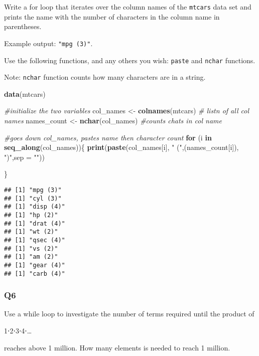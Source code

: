 \documentclass[
]{article}
\newenvironment{Shaded}{\begin{snugshade}}{\end{snugshade}}
\newcommand{\CommentTok}[1]{\textcolor[rgb]{0.56,0.35,0.01}{\textit{#1}}}
\newcommand{\ControlFlowTok}[1]{\textcolor[rgb]{0.13,0.29,0.53}{\textbf{#1}}}
\newcommand{\DataTypeTok}[1]{\textcolor[rgb]{0.13,0.29,0.53}{#1}}
\newcommand{\KeywordTok}[1]{\textcolor[rgb]{0.13,0.29,0.53}{\textbf{#1}}}
\newcommand{\NormalTok}[1]{#1}
\newcommand{\StringTok}[1]{\textcolor[rgb]{0.31,0.60,0.02}{#1}}
\begin{document}
Write a for loop that iterates over the column names of the
\texttt{mtcars} data set and prints the name with the number of
characters in the column name in parentheses.

Example output: \texttt{"mpg\ (3)"}.

Use the following functions, and any others you wish: \texttt{paste} and
\texttt{nchar} functions.

Note: \texttt{nchar} function counts how many characters are in a
string.

\begin{Shaded}
\begin{Highlighting}[]
\KeywordTok{data}\NormalTok{(mtcars)}

\CommentTok{#initialize the two variables}
\NormalTok{col_names <-}\StringTok{ }\KeywordTok{colnames}\NormalTok{(mtcars) }\CommentTok{# listn of all col names}
\NormalTok{names_count <-}\StringTok{ }\KeywordTok{nchar}\NormalTok{(col_names) }\CommentTok{#counts chats in col name}

\CommentTok{#goes down col_names, pastes name then character count}
\ControlFlowTok{for}\NormalTok{ (i }\ControlFlowTok{in} \KeywordTok{seq_along}\NormalTok{(col_names))\{}
    \KeywordTok{print}\NormalTok{(}\KeywordTok{paste}\NormalTok{(col_names[i], }\StringTok{" ("}\NormalTok{,(names_count[i]), }\StringTok{")"}\NormalTok{,}\DataTypeTok{sep =} \StringTok{""}\NormalTok{))}

\NormalTok{\}}
\end{Highlighting}
\end{Shaded}

\begin{verbatim}
## [1] "mpg (3)"
## [1] "cyl (3)"
## [1] "disp (4)"
## [1] "hp (2)"
## [1] "drat (4)"
## [1] "wt (2)"
## [1] "qsec (4)"
## [1] "vs (2)"
## [1] "am (2)"
## [1] "gear (4)"
## [1] "carb (4)"
\end{verbatim}

\hypertarget{q6}{%
\subsubsection{Q6}\label{q6}}

Use a while loop to investigate the number of terms required until the
product of

1⋅2⋅3⋅4⋅\ldots{}

reaches above 1 million. How many elements is needed to reach 1 million.
\end{document}
